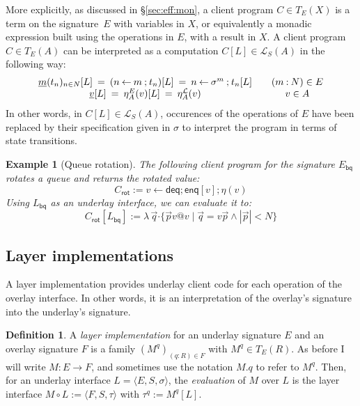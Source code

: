 \documentclass[11pt,oneside,draft]{book}
\newtheorem{example}[theorem]{Example}
\theoremstyle{definition}
\newtheorem{definition}[theorem]{Definition}
\newcommand{\kw}[1]{\ensuremath{ \mathsf{#1} }}
\newcommand{\bdot}{\boldsymbol{\cdot}}
\newcommand{\ul}[1]{%
  \underline{\smash{#1}}
}
\begin{document}
More explicitly,
as discussed in \S\ref{sec:eff:mon},
a client program $C \in T_E(X)$
is a term on the signature~$E$ with variables in $X$,
or equivalently a monadic expression built using
the operations in $E$, with a result in $X$.
A client program $C \in T_E(A)$
can be interpreted as
a computation $C[L] \in \mathcal{L}_S(A)$ in the following way:
\[
  \begin{array}{c@{\qquad}c}
    \ul{m}(t_n)_{n \in N}[L] \: = \:
      (n \mathbin\leftarrow m \mathbin; t_n)[L] \: = \:
      n \mathbin\leftarrow \sigma^m \mathbin; t_n[L] &
      (m \mathbin: N) \in E \\
    \ul{v}[L] \: = \:
      \eta^E_A(v)[L] \: = \:
      \eta^\mathcal{L}_A(v) &
      v \in A
  \end{array}
\]
In other words, in $C[L] \in \mathcal{L}_S(A)$,
occurences of the operations of $E$
have been replaced by their specification given in $\sigma$
to interpret the program in terms of state transitions.

\begin{example}[Queue rotation]
The following client program for the signature $E_\kw{bq}$
rotates a queue and returns the rotated value:
\[
  C_\kw{rot} :=
    v \mathbin\leftarrow \kw{deq} \mathbin; \kw{enq}[v] \mathbin; \eta(v)
\]
Using $L_\kw{bq}$ as an underlay interface,
we can evaluate it to:
\[
  C_\kw{rot}[L_\kw{bq}] :=
    \lambda \, \vec{q} \bdot
    \{ \vec{p}v@v \mid \vec{q} = v\vec{p} \wedge |\vec{p}| < N \}
\]
\end{example}


\subsection{Layer implementations} \label{sec:cal:impl} %

A layer implementation provides underlay client code
for each operation of the overlay interface.
In other words,
it is an interpretation of the overlay's signature
into the underlay's signature.

\begin{definition}
A \emph{layer implementation}
for an underlay signature $E$ and
an overlay signature $F$
is a family $(M^q)_{(q \mathbin: R) \in F}$
with $M^q \in T_E(R)$.
As before I will write $M : E \rightarrow F$, and
sometimes use the notation $M.q$
to refer to $M^q$.
Then,
for an underlay interface $L = \langle E, S, \sigma \rangle$,
the \emph{evaluation} of $M$ over $L$ is
the layer interface
$
  M \circ L := \langle F, S, \tau \rangle
$
with $\tau^q := M^q[L]$.
\end{definition}
\end{document}

